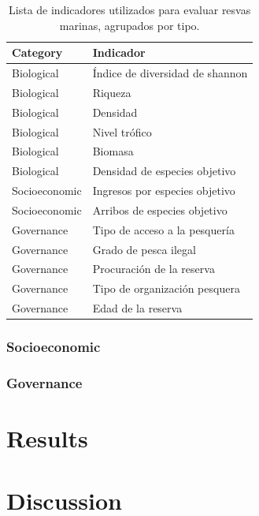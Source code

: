 \documentclass{frontiersSCNS}
\begin{document}
\begin{table}

\caption{\label{tab:unnamed-chunk-3}\label{table:indicators}Lista de indicadores utilizados para evaluar resvas marinas, agrupados por tipo.}
\centering
\begin{tabular}[t]{l|l}
\hline
Category & Indicador\\
\hline
Biological & Índice de diversidad de shannon\\
\hline
Biological & Riqueza\\
\hline
Biological & Densidad\\
\hline
Biological & Nivel trófico\\
\hline
Biological & Biomasa\\
\hline
Biological & Densidad de especies objetivo\\
\hline
Socioeconomic & Ingresos por especies objetivo\\
\hline
Socioeconomic & Arribos de especies objetivo\\
\hline
Governance & Tipo de acceso a la pesquería\\
\hline
Governance & Grado de pesca ilegal\\
\hline
Governance & Procuración de la reserva\\
\hline
Governance & Tipo de organización pesquera\\
\hline
Governance & Edad de la reserva\\
\hline
\end{tabular}
\end{table}

\subsubsection{Socioeconomic}\label{socioeconomic}

\subsubsection{Governance}\label{governance}

\section{Results}\label{results}

\section{Discussion}\label{discussion}
\end{document}

